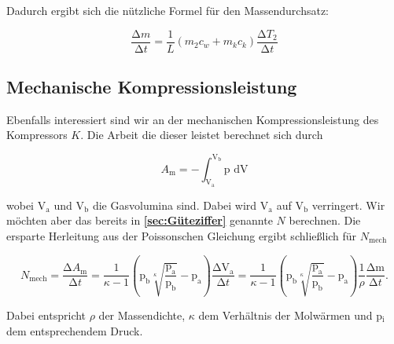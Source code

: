 Dadurch ergibt sich die nützliche Formel für den Massendurchsatz:

\begin{equation}
    \frac{\increment m}{\increment t} = \frac{1}{L} (m_{2} c_{w} + m_{k} c_{k}) \frac{\increment T_{2}}{\increment t}
\end{equation}

\subsection{Mechanische Kompressionsleistung}

Ebenfalls interessiert sind wir an der mechanischen Kompressionsleistung des Kompressors $K$.
Die Arbeit die dieser leistet berechnet sich durch

\begin{equation}
    A_{\text{m}} = - \int_{\text{V}_\text{a}}^{\text{V}_\text{b}} \text{p dV} 
\end{equation}

wobei $\text{V}_\text{a}$ und $\text{V}_\text{b}$ die Gasvolumina sind.
Dabei wird $\text{V}_\text{a}$ auf $\text{V}_\text{b}$ verringert.
Wir möchten aber das bereits in \textbf{\ref{sec:Güteziffer}} genannte $N$ berechnen.
Die ersparte Herleitung aus der Poissonschen Gleichung ergibt schließlich für $N_\text{mech}$

\begin{equation}
    N_\text{mech} = \frac{\increment A_{\text{m}}} {\increment t}
    = \frac{1}{\kappa - 1} \left(\text{p}_\text{b} \sqrt[\kappa]{\frac{\text{p}_\text{a}}{\text{p}_\text{b}}
    } - \text{p}_\text{a} \right) \frac{\increment \text{V}_\text{a}}{\increment t}
    = \frac{1}{\kappa - 1} \left(\text{p}_\text{b} \sqrt[\kappa]{\frac{\text{p}_\text{a}}{\text{p}_\text{b}}
    } - \text{p}_\text{a} \right) \frac{1}{\rho} \frac{\increment \text{m}}{\increment t}.
\end{equation}

Dabei entspricht $\rho$ der Massendichte, $\kappa$ dem Verhältnis der Molwärmen und p$_\text{i}$ 
dem entsprechendem Druck.

